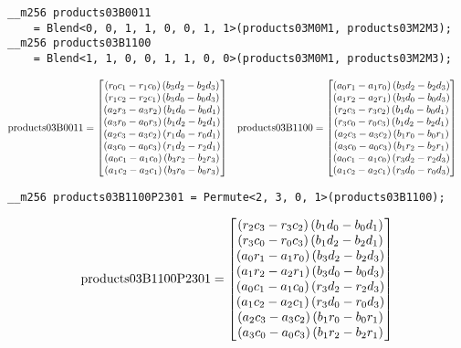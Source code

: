 \begin{verbatim}
__m256 products03B0011 
    = Blend<0, 0, 1, 1, 0, 0, 1, 1>(products03M0M1, products03M2M3);
__m256 products03B1100 
    = Blend<1, 1, 0, 0, 1, 1, 0, 0>(products03M0M1, products03M2M3);
\end{verbatim} 
\begin{align*}
\mathrm{products03B0011} 
=
\begin{bmatrix}
\left(r_0c_1 - r_1c_0\right)\left(b_3d_2 - b_2d_3\right)\\
\left(r_1c_2 - r_2c_1\right)\left(b_3d_0 - b_0d_3\right)\\
\left(a_2r_3 - a_3r_2\right)\left(b_1d_0 - b_0d_1\right)\\
\left(a_3r_0 - a_0r_3\right)\left(b_1d_2 - b_2d_1\right)\\
\left(a_2c_3 - a_3c_2\right)\left(r_1d_0 - r_0d_1\right)\\
\left(a_3c_0 - a_0c_3\right)\left(r_1d_2 - r_2d_1\right)\\
\left(a_0c_1 - a_1c_0\right)\left(b_3r_2 - b_2r_3\right)\\
\left(a_1c_2 - a_2c_1\right)\left(b_3r_0 - b_0r_3\right)\\
\end{bmatrix}
&&
\mathrm{products03B1100} 
&=
\begin{bmatrix}
\left(a_0r_1 - a_1r_0\right)\left(b_3d_2 - b_2d_3\right)\\
\left(a_1r_2 - a_2r_1\right)\left(b_3d_0 - b_0d_3\right)\\
\left(r_2c_3 - r_3c_2\right)\left(b_1d_0 - b_0d_1\right)\\
\left(r_3c_0 - r_0c_3\right)\left(b_1d_2 - b_2d_1\right)\\
\left(a_2c_3 - a_3c_2\right)\left(b_1r_0 - b_0r_1\right)\\
\left(a_3c_0 - a_0c_3\right)\left(b_1r_2 - b_2r_1\right)\\
\left(a_0c_1 - a_1c_0\right)\left(r_3d_2 - r_2d_3\right)\\
\left(a_1c_2 - a_2c_1\right)\left(r_3d_0 - r_0d_3\right)\\
\end{bmatrix}
\end{align*}

\begin{verbatim}
__m256 products03B1100P2301 = Permute<2, 3, 0, 1>(products03B1100);
\end{verbatim} 
\begin{align*}
\mathrm{products03B1100P2301} 
=
\begin{bmatrix}
\left(r_2c_3 - r_3c_2\right)\left(b_1d_0 - b_0d_1\right)\\
\left(r_3c_0 - r_0c_3\right)\left(b_1d_2 - b_2d_1\right)\\
\left(a_0r_1 - a_1r_0\right)\left(b_3d_2 - b_2d_3\right)\\
\left(a_1r_2 - a_2r_1\right)\left(b_3d_0 - b_0d_3\right)\\
\left(a_0c_1 - a_1c_0\right)\left(r_3d_2 - r_2d_3\right)\\
\left(a_1c_2 - a_2c_1\right)\left(r_3d_0 - r_0d_3\right)\\
\left(a_2c_3 - a_3c_2\right)\left(b_1r_0 - b_0r_1\right)\\
\left(a_3c_0 - a_0c_3\right)\left(b_1r_2 - b_2r_1\right)\\
\end{bmatrix}
\end{align*}


